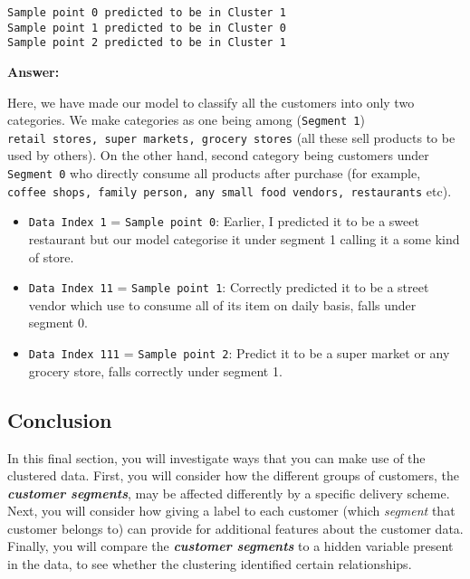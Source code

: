 \documentclass[11pt]{article}
\begin{document}
    \begin{Verbatim}[commandchars=\\\{\}]
Sample point 0 predicted to be in Cluster 1
Sample point 1 predicted to be in Cluster 0
Sample point 2 predicted to be in Cluster 1

    \end{Verbatim}

    \textbf{Answer:}

Here, we have made our model to classify all the customers into only two
categories. We make categories as one being among (\texttt{Segment\ 1})
\texttt{retail\ stores,\ super\ markets,\ grocery\ stores} (all these
sell products to be used by others). On the other hand, second category
being customers under \texttt{Segment\ 0} who directly consume all
products after purchase (for example,
\texttt{coffee\ shops,\ family\ person,\ any\ small\ food\ vendors,\ restaurants}
etc).

\begin{itemize}
\item
  \texttt{Data\ Index\ 1} = \texttt{Sample\ point\ 0}: Earlier, I
  predicted it to be a sweet restaurant but our model categorise it
  under segment 1 calling it a some kind of store.
\item
  \texttt{Data\ Index\ 11} = \texttt{Sample\ point\ 1}: Correctly
  predicted it to be a street vendor which use to consume all of its
  item on daily basis, falls under segment 0.
\item
  \texttt{Data\ Index\ 111} = \texttt{Sample\ point\ 2}: Predict it to
  be a super market or any grocery store, falls correctly under segment
  1.
\end{itemize}

    \hypertarget{conclusion}{%
\subsection{Conclusion}\label{conclusion}}

    In this final section, you will investigate ways that you can make use
of the clustered data. First, you will consider how the different groups
of customers, the \textbf{\emph{customer segments}}, may be affected
differently by a specific delivery scheme. Next, you will consider how
giving a label to each customer (which \emph{segment} that customer
belongs to) can provide for additional features about the customer data.
Finally, you will compare the \textbf{\emph{customer segments}} to a
hidden variable present in the data, to see whether the clustering
identified certain relationships.
\end{document}
